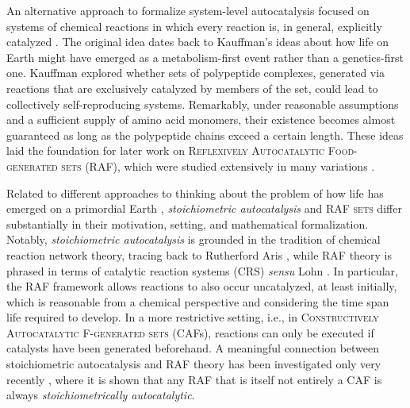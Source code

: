 \documentclass[pdflatex]{sn-jnl}
\theoremstyle{thmstyleone}%
\theoremstyle{examplesty}%
\theoremstyle{thmstylethree}%
\begin{document}
An alternative approach to formalize system-level autocatalysis focused on
systems of chemical reactions in which every reaction is, in general,
explicitly catalyzed \cite{lohn_evolving_1998, steel_emergence_2000}. The
original idea dates back to Kauffman's \cite{kauffman_autocatalytic_1986}
ideas about how life on Earth might have emerged as a metabolism-first 
event rather than a genetics-first one. Kauffman explored
whether sets of polypeptide complexes, generated via reactions that are
exclusively catalyzed by members of the set, could lead to collectively
self-reproducing systems.  Remarkably, under reasonable assumptions and a
sufficient supply of amino acid monomers, their existence becomes almost
guaranteed as long as the polypeptide chains exceed a certain length. These
ideas laid the foundation for later work on \textsc{Reflexively
  Autocatalytic Food-generated sets} (RAF), which were studied extensively
in many variations \cite{steel_emergence_2000, mossel_random_2005,
  steel_minimal_2013, smith_autocatalytic_2014, hordijk_history_2019,
  steel20}.

Related to different approaches to thinking about the problem of how life
has emerged on a primordial Earth \cite{kauffman_autocatalytic_1986,
  peng_hierarchical_2022, unterberger_stoechiometric_2022},
\emph{stoichiometric autocatalysis} and \textsc{RAF sets} differ
substantially in their motivation, setting, and mathematical
formalization. Notably, \emph{stoichiometric autocatalysis} is grounded in
the tradition of chemical reaction network theory, tracing back to
Rutherford Aris \cite{aris_prolegomena_1965}, while \textsc{RAF} theory is
phrased in terms of catalytic reaction systems (CRS) \textit{sensu} Lohn
\cite{lohn_evolving_1998}. In particular, the RAF framework allows
reactions to also occur uncatalyzed, at least initially, which is
reasonable from a chemical perspective and considering the time span life
required to develop. In a more restrictive setting, i.e., in
\textsc{Constructively Autocatalytic F-generated sets} (CAFs), reactions
can only be executed if catalysts have been generated beforehand. A
meaningful connection between stoichiometric autocatalysis and RAF theory
has been investigated only very recently \cite{golnik_bridging_2026}, where
it is shown that any RAF that is itself not entirely a CAF is always
\emph{stoichiometrically autocatalytic}.

\end{document}
